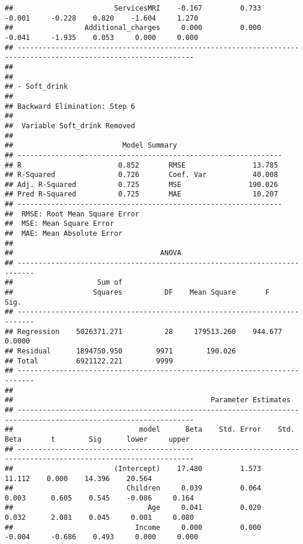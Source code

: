 \documentclass[
]{article}
\begin{document}
\begin{verbatim}
##                        ServicesMRI    -0.167         0.733       -0.001     -0.228    0.820    -1.604     1.270 
##                 Additional_charges     0.000         0.000       -0.041     -1.935    0.053     0.000     0.000 
## ----------------------------------------------------------------------------------------------------------------
## 
## 
## - Soft_drink 
## 
## Backward Elimination: Step 6 
## 
##  Variable Soft_drink Removed 
## 
##                          Model Summary                          
## ---------------------------------------------------------------
## R                       0.852       RMSE                13.785 
## R-Squared               0.726       Coef. Var           40.008 
## Adj. R-Squared          0.725       MSE                190.026 
## Pred R-Squared          0.725       MAE                 10.207 
## ---------------------------------------------------------------
##  RMSE: Root Mean Square Error 
##  MSE: Mean Square Error 
##  MAE: Mean Absolute Error 
## 
##                                   ANOVA                                    
## --------------------------------------------------------------------------
##                    Sum of                                                 
##                   Squares          DF    Mean Square       F         Sig. 
## --------------------------------------------------------------------------
## Regression    5026371.271          28     179513.260    944.677    0.0000 
## Residual      1894750.950        9971        190.026                      
## Total         6921122.221        9999                                     
## --------------------------------------------------------------------------
## 
##                                               Parameter Estimates                                                
## ----------------------------------------------------------------------------------------------------------------
##                              model      Beta    Std. Error    Std. Beta       t        Sig      lower     upper 
## ----------------------------------------------------------------------------------------------------------------
##                        (Intercept)    17.480         1.573                  11.112    0.000    14.396    20.564 
##                           Children     0.039         0.064        0.003      0.605    0.545    -0.086     0.164 
##                                Age     0.041         0.020        0.032      2.001    0.045     0.001     0.080 
##                             Income     0.000         0.000       -0.004     -0.686    0.493     0.000     0.000 

\end{verbatim}
\end{document}
